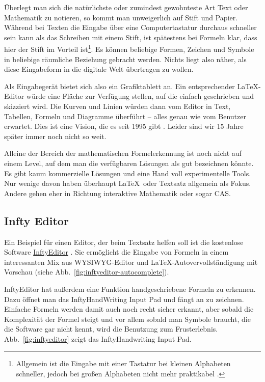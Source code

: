 Überlegt man sich die natürlichste oder zumindest gewohnteste Art Text oder Mathematik zu notieren, so kommt man unweigerlich auf Stift und Papier. Während bei Texten die Eingabe über eine Computertastatur durchaus schneller sein kann als das Schreiben mit einem Stift, ist spätestens bei Formeln klar, dass hier der Stift im Vorteil ist\footnote{Allgemein ist die Eingabe mit einer Tastatur bei kleinen Alphabeten schneller, jedoch bei großen Alphabeten nicht mehr praktikabel \cite{Tappert:1990p10302}.}. Es können beliebige Formen, Zeichen und Symbole in beliebige räumliche Beziehung gebracht werden. Nichts liegt also näher, als diese Eingabeform in die digitale Welt übertragen zu wollen.

Als Eingabegerät bietet sich also ein Grafiktablett an. Ein entsprechender \LaTeX-Editor würde eine Fläche zur Verfügung stellen, auf die einfach geschrieben und skizziert wird. Die Kurven und Linien würden dann vom Editor in Text, Tabellen, Formeln und Diagramme überführt -- alles genau wie vom Benutzer erwartet. Dies ist eine Vision, die es seit 1995 gibt \cite{Meyer:1995p10480}. Leider sind wir 15 Jahre später immer noch nicht so weit.

Alleine der Bereich der mathematischen Formelerkennung ist noch nicht auf einem Level, auf dem man die verfügbaren Lösungen als gut bezeichnen könnte. Es gibt kaum kommerzielle Lösungen und eine Hand voll experimentelle Tools. Nur wenige davon haben überhaupt \LaTeX~oder Textsatz allgemein als Fokus. Andere gehen eher in Richtung interaktive Mathematik oder sogar \ac{CAS}.

\subsection{Infty Editor}

Ein Beispiel für einen Editor, der beim Textsatz helfen soll ist die kostenlose Software \href{http://www.inftyproject.org}{InftyEditor} \cite{Suzuki:2003p786}. Sie ermöglicht die Eingabe von Formeln in einem interessanten Mix aus \ac{WYSIWYG}-Editor und \LaTeX-Autovervollständigung mit Vorschau (siehe Abb.~\ref{fig:inftyeditor-autocomplete}). 

InftyEditor hat außerdem eine Funktion handgeschriebene Formeln zu erkennen. Dazu öffnet man das InftyHandWriting Input Pad und fängt an zu zeichnen. Einfache Formeln werden damit auch noch recht sicher erkannt, aber sobald die Komplexität der Formel steigt und vor allem sobald man Symbole braucht, die die Software gar nicht kennt, wird die Benutzung zum Frusterlebnis. Abb.~\ref{fig:inftyeditor} zeigt das InftyHandwriting Input Pad.


